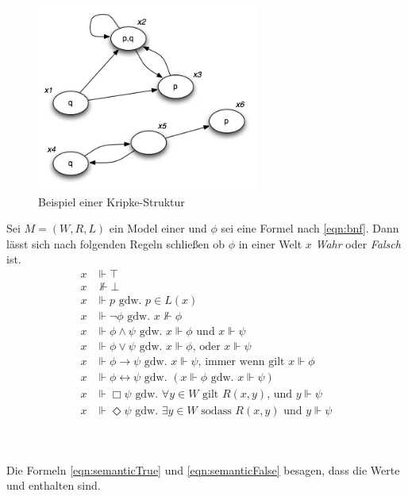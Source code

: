 \begin{figure}[ht]
	\begin{center}
  	\includegraphics[width=0.65\textwidth]{./Images/Kripke01.png}
  	\caption{Beispiel einer Kripke-Struktur}
		\label{fig:mmKripke01}
	\end{center}
\end{figure}

\begin{definition}
	\label{def:reasoning}
	\label{eq:possibleWorlds}
	Sei $M = (W,R,L)$ ein Model einer \ML und $\phi$ sei eine Formel nach \eqref{eqn:bnf}.
	Dann lässt sich nach folgenden Regeln schließen ob $\phi$ in einer Welt $x$ \emph{Wahr} oder \emph{Falsch} ist.
	\begin{align}
		x &\Vdash \top\label{eqn:semanticTrue}\\
		x &\nVdash \bot\label{eqn:semanticFalse}\\
		x &\Vdash p\text{ gdw. }p \in L(x)\label{eqn:semanticLabel}\\
		x &\Vdash \neg \phi\text{ gdw. }x \nVdash \phi\\
		x &\Vdash \phi \wedge \psi\text{ gdw. }x \Vdash \phi\text{ und } x \Vdash \psi\label{eqn:semanticAnd}\\
		x &\Vdash \phi \vee \psi\text{ gdw. }x \Vdash \phi \text{, oder } x \Vdash \psi\\
		x &\Vdash \phi \rightarrow \psi\text{ gdw. }x \Vdash \psi\text{, immer wenn gilt }x \Vdash \phi\\
		x &\Vdash \phi \leftrightarrow \psi\text{ gdw. }( x \Vdash \phi\text{ gdw. }x \Vdash \psi)\label{eqn:semanticBiconditional}\\
		x &\Vdash \Box \psi \text{ gdw. }\forall y \in W \text{ gilt } R(x,y)\text{, und } y \Vdash \psi\label{eqn:semanticBox}\\
		x &\Vdash \Diamond \psi\text{ gdw. }\exists y \in W \text{ sodass }R(x,y)\text{ und }y \Vdash \psi\label{eqn:semanticDiamond}
	\end{align}	
\end{definition}
\cite[S.310]{huth2004logic}\\
\\
%
%
Die Formeln \eqref{eqn:semanticTrue} und \eqref{eqn:semanticFalse} besagen, dass die Werte \true und \false enthalten sind. 

